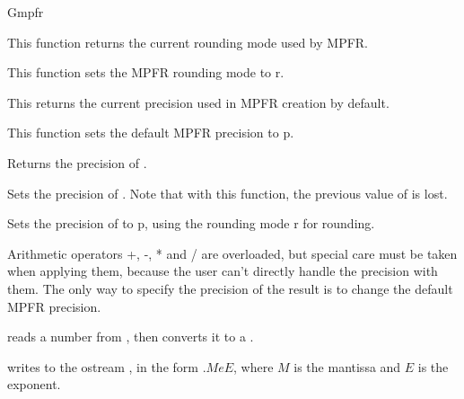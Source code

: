 \begin{ccRefClass} {Gmpfr}
\ccOperations



	{This function returns the current rounding mode used by MPFR.}

	{This function sets the MPFR rounding mode to r.}

	{This returns the current precision used in MPFR creation
	by default.}

	{This function sets the default MPFR precision to p.}

	{}

	{Returns the precision of \ccVar.}

	{Sets the precision of \ccVar.
	Note that with this function, the previous value of \ccVar is lost.}

	{Sets the precision of \ccVar to p, using the rounding mode r
	for rounding.}





Arithmetic operators +, -, * and / are overloaded, but special care must
be taken when applying them, because the user can't directly handle the
precision with them.
The only way to specify the precision of the result is to change the
default MPFR precision.






	{reads a number from , then converts it to a .}

	{writes  to the ostream , in the form
	\(.MeE\), where \(M\) is the mantissa and \(E\) is the exponent.}



\end{ccRefClass} 
